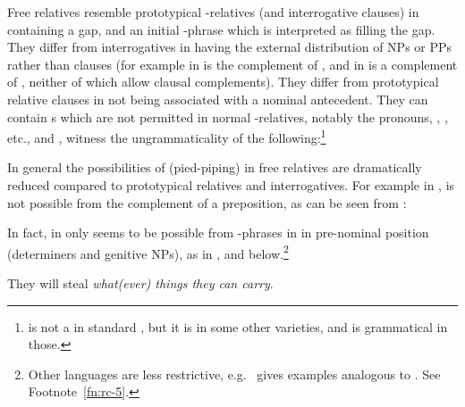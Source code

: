 \documentclass[output=paper
 	        ,biblatex
                ,babelshorthands
                ,newtxmath
                ,draftmode
                ,colorlinks, citecolor=brown
]{langscibook}
\begin{document}
Free relatives resemble prototypical -relatives (and interrogative clauses) in containing a
gap, and an initial -phrase which is interpreted as filling the gap.  They
differ from interrogatives in having  the external
distribution of NPs or PPs rather than clauses (for example in   is the complement of , and in  
is a complement of , neither of which allow clausal complements). They differ
from prototypical relative clauses in not being associated with a nominal antecedent. They can
contain s which are not permitted in normal -relatives, notably the
 pronouns, , , etc., and , witness the
ungrammaticality of the following:\footnote{ is not a  in
  standard , but it is in some other varieties, and  is grammatical in
  those.}
\begin{exe}\ex\begin{xlist}\label{x:rc-144}
\end{xlist}\end{exe}
In general the possibilities of  (pied-piping) in free relatives are
dramatically reduced compared to prototypical relatives and interrogatives. For example in , 
 is not possible from the complement of a preposition, as can be seen
from :
\begin{exe}\ex\begin{xlist}
\end{xlist}\end{exe}
In fact, in    only seems to be possible from -phrases in in pre-nominal position
(determiners and genitive NPs), as in , and  below.\footnote{Other
  languages are less restrictive, e.g.\ \cite[57]{Mueller99b} gives  examples
  analogous to . See Footnote~\ref{fn:rc-5}.}
\begin{exe}\ex
  \label{x:rc-149} They will steal \emph{what(ever) things they can carry}.
\end{exe}
\end{document}
